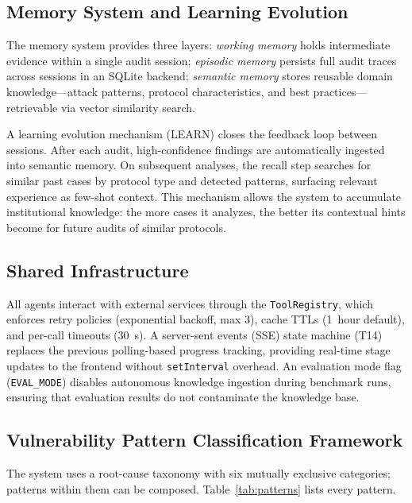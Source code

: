 \documentclass[10pt]{article}
\begin{document}
\subsection{Memory System and Learning Evolution}
The memory system provides three layers: \textit{working memory} holds intermediate evidence within a single audit session; \textit{episodic memory} persists full audit traces across sessions in an SQLite backend; \textit{semantic memory} stores reusable domain knowledge---attack patterns, protocol characteristics, and best practices---retrievable via vector similarity search.

A learning evolution mechanism (LEARN) closes the feedback loop between sessions. After each audit, high-confidence findings are automatically ingested into semantic memory. On subsequent analyses, the recall step searches for similar past cases by protocol type and detected patterns, surfacing relevant experience as few-shot context. This mechanism allows the system to accumulate institutional knowledge: the more cases it analyzes, the better its contextual hints become for future audits of similar protocols.

\subsection{Shared Infrastructure}
All agents interact with external services through the \texttt{ToolRegistry}, which enforces retry policies (exponential backoff, max 3), cache TTLs (1~hour default), and per-call timeouts (30~s). A server-sent events (SSE) state machine (T14) replaces the previous polling-based progress tracking, providing real-time stage updates to the frontend without \texttt{setInterval} overhead. An evaluation mode flag (\texttt{EVAL\_MODE}) disables autonomous knowledge ingestion during benchmark runs, ensuring that evaluation results do not contaminate the knowledge base.

\subsection{Vulnerability Pattern Classification Framework}
The system uses a root-cause taxonomy with six mutually exclusive categories; patterns within them can be composed. Table~\ref{tab:patterns} lists every pattern.
\end{document}
